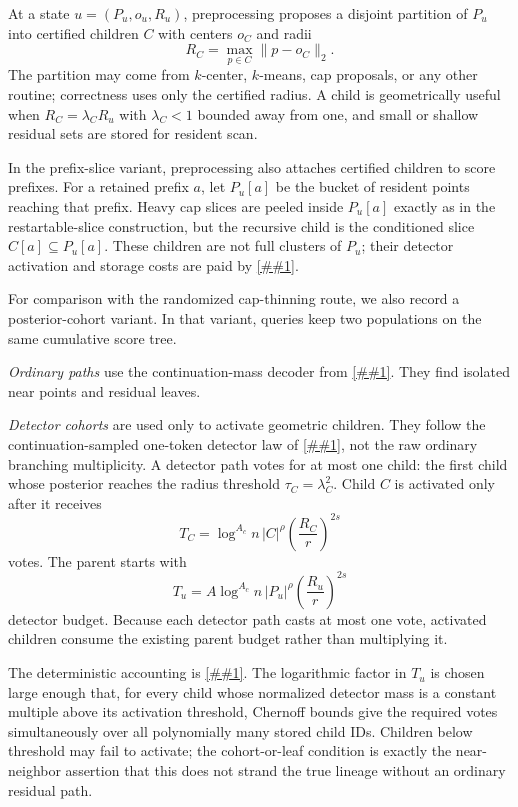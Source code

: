 \documentclass[10pt]{article}
\newcommand{\cref}[1]{\ref{##1}}
\theoremstyle{definition}
\begin{document}
At a state $u=(P_u,o_u,R_u)$, preprocessing proposes a disjoint partition of $P_u$ into certified children $C$ with centers $o_C$ and radii
\[
   R_C=\max_{p\in C}\|p-o_C\|_2.
\]
The partition may come from $k$-center, $k$-means, cap proposals, or any other routine; correctness uses only the certified radius. A child is geometrically useful when $R_C=\lambda_C R_u$ with $\lambda_C<1$ bounded away from one, and small or shallow residual sets are stored for resident scan.

In the prefix-slice variant, preprocessing also attaches certified children to score prefixes. For a retained prefix $a$, let $P_u[a]$ be the bucket of resident points reaching that prefix. Heavy cap slices are peeled inside $P_u[a]$ exactly as in the restartable-slice construction, but the recursive child is the conditioned slice $C[a]\subseteq P_u[a]$. These children are not full clusters of $P_u$; their detector activation and storage costs are paid by \cref{lem:prefix-slice-accounting}.

For comparison with the randomized cap-thinning route, we also record a posterior-cohort variant. In that variant, queries keep two populations on the same cumulative score tree.

\emph{Ordinary paths} use the continuation-mass decoder from \cref{lem:continuation-work}. They find isolated near points and residual leaves.

\emph{Detector cohorts} are used only to activate geometric children. They follow the continuation-sampled one-token detector law of \cref{lem:continuation-detector}, not the raw ordinary branching multiplicity. A detector path votes for at most one child: the first child whose posterior reaches the radius threshold $\tau_C=\lambda_C^2$. Child $C$ is activated only after it receives
\[
   T_C=\log^{A_c}n\,|C|^\rho\left(\frac{R_C}{r}\right)^{2s}
\]
votes. The parent starts with
\[
   T_u=A\log^{A_c}n\,|P_u|^\rho\left(\frac{R_u}{r}\right)^{2s}
\]
detector budget. Because each detector path casts at most one vote, activated children consume the existing parent budget rather than multiplying it.

The deterministic accounting is \cref{lem:vote-budget}. The logarithmic factor in $T_u$ is chosen large enough that, for every child whose normalized detector mass is a constant multiple above its activation threshold, Chernoff bounds give the required votes simultaneously over all polynomially many stored child IDs. Children below threshold may fail to activate; the cohort-or-leaf condition is exactly the near-neighbor assertion that this does not strand the true lineage without an ordinary residual path.
\end{document}

